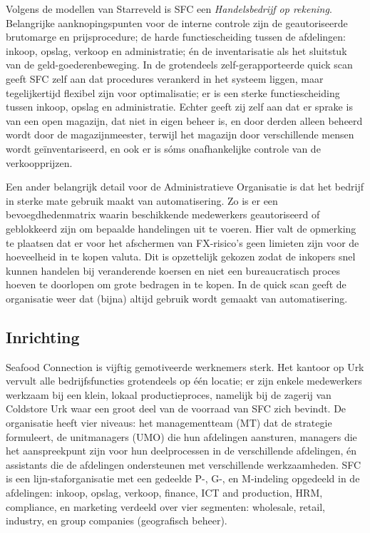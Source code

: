 Volgens de modellen van Starreveld is SFC een \textit{Handelsbedrijf op rekening}. Belangrijke aanknopingspunten voor de interne controle zijn de geautoriseerde brutomarge en prijsprocedure; de harde functiescheiding tussen de afdelingen: inkoop, opslag, verkoop en administratie; én de inventarisatie als het sluitstuk van de geld-goederenbeweging. In de grotendeels zelf-gerapporteerde quick scan geeft SFC zelf aan dat procedures verankerd in het systeem liggen, maar tegelijkertijd flexibel zijn voor optimalisatie; er is een sterke functiescheiding tussen inkoop, opslag en administratie. Echter geeft zij zelf aan dat er sprake is van een open magazijn, dat niet in eigen beheer is, en door derden alleen beheerd wordt door de magazijnmeester, terwijl het magazijn door verschillende mensen wordt geïnventariseerd, en ook er is sóms onafhankelijke controle van de verkoopprijzen. \citep{bivperspectief,quickscan}

Een ander belangrijk detail voor de Administratieve Organisatie is dat het bedrijf in sterke mate gebruik maakt van automatisering. Zo is er een bevoegdhedenmatrix waarin beschikkende medewerkers geautoriseerd of geblokkeerd zijn om bepaalde handelingen uit te voeren. Hier valt de opmerking te plaatsen dat er voor het afschermen van FX-risico's geen limieten zijn voor de hoeveelheid in te kopen valuta. Dit is opzettelijk gekozen zodat de inkopers snel kunnen handelen bij veranderende koersen en niet een bureaucratisch proces hoeven te doorlopen om grote bedragen in te kopen. In de quick scan geeft de organisatie weer dat (bijna) altijd gebruik wordt gemaakt van automatisering. \citep{quickscan}

\subsection{Inrichting}
Seafood Connection is vijftig gemotiveerde werknemers sterk. Het kantoor op Urk vervult alle bedrijfsfuncties grotendeels op één locatie; er zijn enkele medewerkers werkzaam bij een klein, lokaal productieproces, namelijk bij de zagerij van Coldstore Urk waar een groot deel van de voorraad van SFC zich bevindt. De organisatie heeft vier niveaus: het managementteam (MT) dat de strategie formuleert, de unitmanagers (UMO) die hun afdelingen aansturen, managers die het aanspreekpunt zijn voor hun deelprocessen in de verschillende afdelingen, én assistants die de afdelingen ondersteunen met verschillende werkzaamheden. SFC is een lijn-staforganisatie met een gedeelde P-, G-, en M-indeling opgedeeld in de afdelingen: inkoop, opslag, verkoop, finance, ICT and production, HRM, compliance, en marketing verdeeld over vier segmenten: wholesale, retail, industry, en group companies (geografisch beheer). \citep{quickscan}
